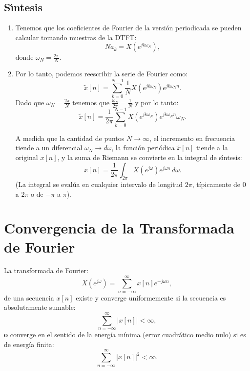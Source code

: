 \documentclass[11pt,a4paper,openany]{book}
\begin{document}
\subsection{S\'{\i}ntesis}

\begin{enumerate}
	\item Tenemos que los coeficientes de Fourier de la versión periodicada se pueden calcular tomando muestras de la DTFT:
	\begin{equation}
		N a_{k} = X(e^{jk\omega_{N}}),
	\end{equation}
	donde $\omega_{N} = \frac{2\pi}{N}$.
	
	\item Por lo tanto, podemos reescribir la serie de Fourier como:
	\begin{equation}
		\tilde{x}[n] = \sum_{k=0}^{N-1} \frac{1}{N} X(e^{jk\omega_{N}}) e^{jk\omega_{N}n}.
	\end{equation}
	Dado que $\omega_{N} = \frac{2\pi}{N}$ tenemos que $\frac{\omega_{N}}{2\pi} = \frac{1}{N}$ y por lo tanto:
	\begin{equation}
		\tilde{x}[n] = \frac{1}{2\pi} \sum_{k=0}^{N-1} X(e^{jk\omega_{N}}) e^{jk\omega_{N}n} \omega_{N}.
	\end{equation}
	
	A medida que la cantidad de puntos $N \to \infty$, el incremento en frecuencia tiende a un diferencial $\omega_{N} \to d\omega$, la funci\'{o}n peri\'{o}dica $\tilde{x}[n]$ tiende a la original $x[n]$, y la suma de Riemann se convierte en la integral de s\'{\i}ntesis:
	\begin{equation}
		x[n] = \frac{1}{2\pi} \int_{2\pi} X(e^{j\omega}) e^{j\omega n} \, d\omega.
	\end{equation}
	(La integral se evalúa en cualquier intervalo de longitud $2\pi$, típicamente de $0$ a $2\pi$ o de $-\pi$ a $\pi$).
\end{enumerate}

\section{Convergencia de la Transformada de Fourier}

La transformada de Fourier:
\begin{equation}
	X(e^{j\omega}) = \sum_{n=-\infty}^{\infty} x[n] e^{-j\omega n},
\end{equation}
de una secuencia $x[n]$ existe y converge uniformemente si la secuencia es absolutamente sumable:
\begin{equation}
	\sum_{n=-\infty}^{\infty} |x[n]| < \infty,
\end{equation}
\textbf{o} converge en el sentido de la energía mínima (error cuadrático medio nulo) si es de energía finita:
\begin{equation}
	\sum_{n=-\infty}^{\infty} |x[n]|^{2} < \infty.
\end{equation}
\end{document}

